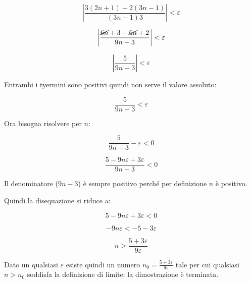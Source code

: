\[
\left|
\frac{
3(2n+1)-2(3n-1)
}{
(3n-1)3
}
\right| < \varepsilon
\]

\[
\left|
\frac{
\cancel{6n}+3-\cancel{6n}+2
}{
9n-3
}
\right| < \varepsilon
\]

\[
\left|
\frac{
5
}{9n-3}
\right| < \varepsilon
\]

Entrambi i tyermini sono positivi quindi non serve il valore assoluto:

\[
\frac{
5
}{9n-3}
< \varepsilon
\]

Ora bisogna risolvere per $n$:

\[
\frac{
5
}{9n-3}
- \varepsilon <0
\]


\[
\frac{5 -9n\varepsilon +3\varepsilon
}{9n-3
} < 0
\]

Il denominatore ($9n-3$) è sempre positivo perché per definizione $n$ è positivo.

Quindi la disequazione si riduce a:

\[
5-9n\varepsilon +3\varepsilon < 0
\]

\[
-9n\varepsilon < -5 -3\varepsilon
\]

\[
n > \frac{5+3\varepsilon}{9\varepsilon}
\]

Dato un qualsiasi $\varepsilon$ esiste quindi un numero $n_0 = \frac{5+3\varepsilon}{9\varepsilon}$ tale per cui qualsiasi $n>n_0$ soddisfa la definizione di limite: la dimostrazione è terminata.
